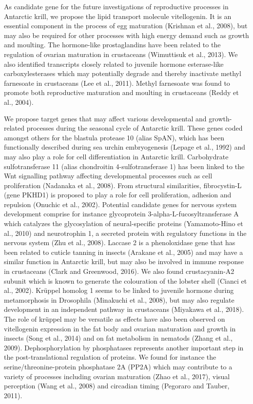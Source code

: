 As candidate gene for the future investigations of reproductive processes in Antarctic krill, we propose the lipid transport molecule vitellogenin. It is an essential component in the process of egg maturation (Krishnan et al., 2008), but may also be required for other processes with high energy demand such as growth and moulting. The hormone-like prostaglandins have been related to the regulation of ovarian maturation in crustaceans (Wimuttisuk et al., 2013). We also identified transcripts closely related to juvenile hormone esterase-like carboxylesterases which may potentially degrade and thereby inactivate methyl farnesoate in crustaceans (Lee et al., 2011). Methyl farnesoate was found to promote both reproductive maturation and moulting in crustaceans (Reddy et al., 2004).

We propose target genes that may affect various developmental and growth-related processes during the seasonal cycle of Antarctic krill. These genes coded amongst others for the blastula protease 10 (alias SpAN), which has been functionally described during sea urchin embryogenesis (Lepage et al., 1992) and may also play a role for cell differentiation in Antarctic krill. Carbohydrate sulfotransferase 11 (alias chondroitin 4-sulfotransferase 1) has been linked to the Wnt signalling pathway affecting developmental processes such as cell proliferation (Nadanaka et al., 2008). From structural similarities, fibrocystin-L (gene PKHD1) is proposed to play a role for cell proliferation, adhesion and repulsion (Onuchic et al., 2002). Potential candidate genes  for nervous system development comprise for instance glycoprotein 3-alpha-L-fucosyltransferase A which catalyzes the glycosylation of neural-specific proteins (Yamamoto-Hino et al., 2010) and neurotrophin 1, a secreted protein with regulatory functions in the nervous system (Zhu et al., 2008). Laccase 2 is a phenoloxidase gene that has been related to cuticle tanning in insects (Arakane et al., 2005) and may have a similar function in Antarctic krill, but may also be involved in immune response in crustaceans (Clark and Greenwood, 2016). We also found crustacyanin-A2 subunit which is known to generate the colouration of the lobster shell (Cianci et al., 2002). Krüppel homolog 1 seems to be linked to juvenile hormone during metamorphosis in Drosophila (Minakuchi et al., 2008), but may also regulate development in an independent pathway in crustaceans (Miyakawa et al., 2018). The role of krüppel may be versatile as effects have also been observed on vitellogenin expression in the fat body and ovarian maturation and growth in insects (Song et al., 2014) and on fat metabolism in nematods (Zhang et al., 2009). 
Dephosphorylation by phosphatases represents another important step in the post-translational regulation of proteins. We found for instance the serine/threonine-protein phosphatase 2A (PP2A) which may contribute to a variety of processes including ovarian maturation (Zhao et al., 2017), visual perception (Wang et al., 2008) and circadian timing (Pegoraro and Tauber, 2011).

